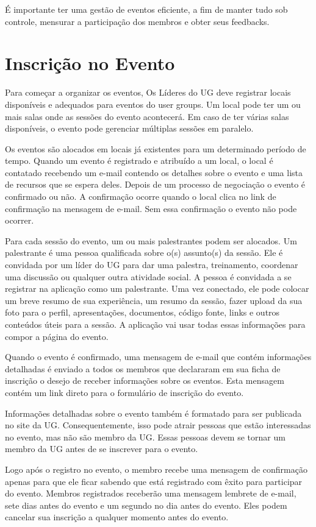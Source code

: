\documentclass[envcountsame,envcountchap,letterpaper]{svmono}
\begin{document}
É importante ter uma gestão de eventos eficiente, a fim de manter tudo sob controle, mensurar a participação dos membros e obter seus feedbacks.

\section{Inscrição no Evento}

Para começar a organizar os eventos, Os Líderes do UG deve registrar locais disponíveis e adequados para eventos do user groups. Um local pode ter um ou mais salas onde as sessões do evento acontecerá. Em caso de ter várias salas disponíveis, o evento pode gerenciar múltiplas sessões em paralelo.

Os eventos são alocados em locais já existentes para um determinado período de tempo. Quando um evento é registrado e atribuído a um local, o local é contatado recebendo um e-mail contendo os detalhes sobre o evento e uma lista de recursos que se espera deles. Depois de um processo de negociação o evento é confirmado ou não. A confirmação ocorre quando o local clica no link de confirmação na mensagem de e-mail. Sem essa confirmação o evento não pode ocorrer.

Para cada sessão do evento, um ou mais palestrantes podem ser alocados. Um palestrante é uma pessoa qualificada sobre o(s) assunto(s) da sessão. Ele é convidada por um líder do UG para dar uma palestra, treinamento, coordenar uma discussão ou qualquer outra atividade social. A pessoa é convidada a se registrar na aplicação como um palestrante. Uma vez conectado, ele pode colocar um breve resumo de sua experiência, um resumo da sessão, fazer upload da sua foto para o perfil, apresentações, documentos, código fonte, links e outros conteúdos úteis para a sessão. A aplicação vai usar todas essas informações para compor a página do evento.

Quando o evento é confirmado, uma mensagem de e-mail que contém informações detalhadas é enviado a todos os membros que declararam em sua ficha de inscrição o desejo de receber informações sobre os eventos. Esta mensagem contém um link direto para o formulário de inscrição do evento.

Informações detalhadas sobre o evento também é formatado para ser publicada no site da UG. Consequentemente, isso pode atrair pessoas que estão interessadas no evento, mas não são membro da UG. Essas pessoas devem se tornar um membro da UG antes de se inscrever para o evento.

Logo após o registro no evento, o membro recebe uma mensagem de confirmação apenas para que ele ficar sabendo que está registrado com êxito para participar do evento. Membros registrados receberão uma mensagem lembrete de e-mail, sete dias antes do evento e um segundo no dia antes do evento. Eles podem cancelar sua inscrição a qualquer momento antes do evento.
\end{document}
